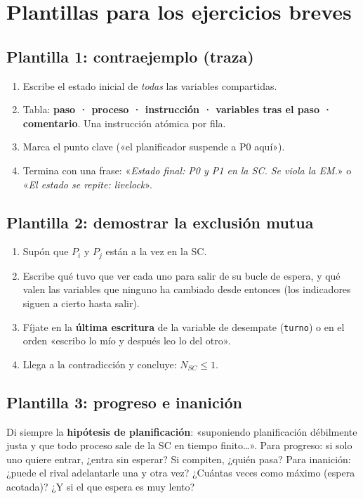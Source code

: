 \documentclass[11pt,a4paper,oneside]{report}
\begin{document}
\section{Plantillas para los ejercicios breves}\label{sec:plantillas}

\subsection{Plantilla 1: contraejemplo (traza)}
\begin{enumerate}[leftmargin=*]
  \item Escribe el estado inicial de \emph{todas} las variables compartidas.
  \item Tabla: \textbf{paso · proceso · instrucción · variables tras el paso · comentario}. Una instrucción
        atómica por fila.
  \item Marca el punto clave («el planificador suspende a P0 aquí»).
  \item Termina con una frase: «\emph{Estado final: P0 y P1 en la SC. Se viola la EM.}» o «\emph{El estado se
        repite: livelock}».
\end{enumerate}

\subsection{Plantilla 2: demostrar la exclusión mutua}
\begin{enumerate}[leftmargin=*]
  \item Supón que $P_i$ y $P_j$ están a la vez en la SC.
  \item Escribe qué tuvo que ver cada uno para salir de su bucle de espera, y qué valen las variables que ninguno
        ha cambiado desde entonces (los indicadores siguen a cierto hasta salir).
  \item Fíjate en la \textbf{última escritura} de la variable de desempate (\texttt{turno}) o en el orden
        «escribo lo mío y después leo lo del otro».
  \item Llega a la contradicción y concluye: $N_{SC} \le 1$.
\end{enumerate}

\subsection{Plantilla 3: progreso e inanición}
Di siempre la \textbf{hipótesis de planificación}: «suponiendo planificación débilmente justa y que todo proceso
sale de la SC en tiempo finito…». Para progreso: si solo uno quiere entrar, ¿entra sin esperar? Si compiten,
¿quién pasa? Para inanición: ¿puede el rival adelantarle una y otra vez? ¿Cuántas veces como máximo (espera
acotada)? ¿Y si el que espera es muy lento?
\end{document}
